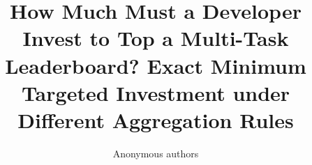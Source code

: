 \documentclass{article}
\title{How Much Must a Developer Invest to Top a Multi-Task Leaderboard? Exact Minimum Targeted Investment under Different Aggregation Rules}
\author{Anonymous authors}
\begin{document}
\maketitle









\label{lastmainpage}
{\small


}

\appendix



\end{document}
